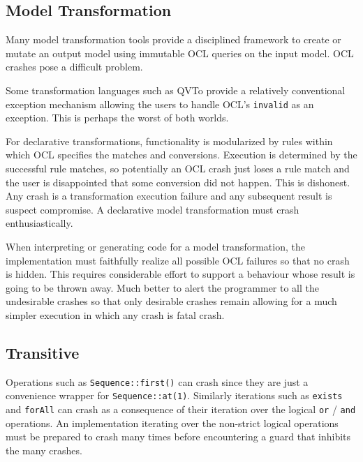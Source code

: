 \documentclass{llncs}
\begin{document}


\subsection{Model Transformation}

Many model transformation tools provide a disciplined framework to create or mutate an output model using immutable OCL queries on the input model. OCL crashes pose a difficult problem.

Some transformation languages such as QVTo \cite{QVT-1.3} provide a relatively conventional exception mechanism allowing the users to handle OCL's \verb|invalid| as an exception. This is perhaps the worst of both worlds.

For declarative transformations, functionality is modularized by rules within which OCL specifies the matches and conversions. Execution is determined by the successful rule matches, so potentially an OCL crash just loses a rule match and the user is disappointed that some conversion did not happen. This is dishonest. Any crash is a transformation execution failure and any subsequent result is suspect compromise. A declarative model transformation must crash enthusiastically.

When interpreting or generating code for a model transformation, the implementation must faithfully realize all possible OCL failures so that no crash is hidden. This requires considerable effort to support a behaviour whose result is going to be thrown away. Much better to alert the programmer to all the undesirable crashes so that only desirable crashes remain allowing for a much simpler execution in which any crash is fatal crash.
 
\subsection{Transitive}
 
Operations such as  \verb|Sequence::first()| can crash since they are just a convenience wrapper for \verb|Sequence::at(1)|. Similarly iterations such as \verb|exists| and \verb|forAll| can crash as a consequence of their iteration over the logical \verb|or| / \verb|and| operations. An implementation iterating over the non-strict logical operations must be prepared to crash many times before encountering a guard that inhibits the many crashes.
 
\end{document}

